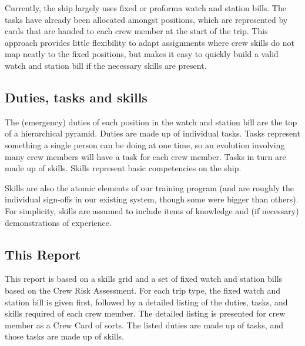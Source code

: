 \documentclass[10pt,a4paper,oneside,landscape]{extarticle}
\begin{document}
\begin{multicols}{2}
Currently, the ship largely uses fixed or proforma watch and station bills. The tasks have already been allocated amongst positions, which are represented by cards that are handed to each crew member at the start of the trip. This approach provides little flexibility to adapt assignments where crew skills do not map neatly to the fixed positions, but makes it easy to quickly build a valid watch and station bill if the necessary skills are present.

\subsection*{Duties, tasks and skills}

The (emergency) duties of each position in the watch and station bill are the top of a hierarchical pyramid. Duties are made up of individual tasks. Tasks represent something a single person can be doing at one time, so an evolution involving many crew members will have a task for each crew member. Tasks in turn are made up of skills. Skills represent basic competencies on the ship. 

Skills are also the atomic elements of our training program (and are roughly the individual sign-offs in our existing system, though some were bigger than others). For simplicity, skills are assumed to include items of knowledge and (if necessary) demonstrations of experience. 

\subsection*{This Report}

This report is based on a skills grid and a set of fixed watch and station bills based on the Crew Risk Assessment. For each trip type, the fixed watch and station bill is given first, followed by a detailed listing of the duties, tasks, and skills required of each crew member. The detailed listing is presented for crew member as a Crew Card of sorts. The listed duties are made up of tasks, and those tasks are made up of skills.


\end{multicols}




\label{LastPage}
\end{document}
